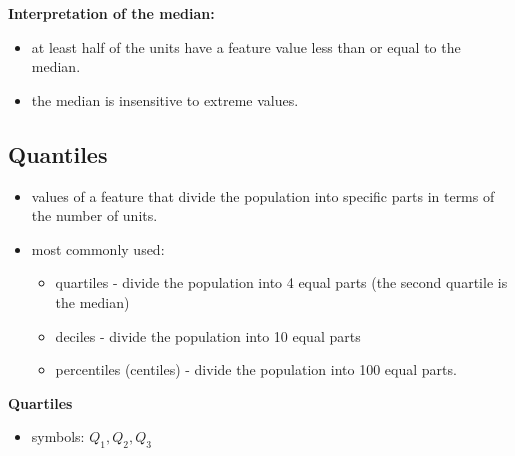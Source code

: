 \documentclass[
  english,
  letterpaper,
  DIV=11,
  numbers=noendperiod]{scrreprt}
\providecommand{\tightlist}{%
  \setlength{\itemsep}{0pt}\setlength{\parskip}{0pt}}
\begin{document}
\textbf{Interpretation of the median:}

\begin{itemize}
\tightlist
\item
  at least half of the units have a feature value less than or equal to
  the median.
\item
  the median is insensitive to extreme values.
\end{itemize}

\subsection{Quantiles}\label{quantiles}

\begin{itemize}
\tightlist
\item
  values of a feature that divide the population into specific parts in
  terms of the number of units.
\item
  most commonly used:

  \begin{itemize}
  \tightlist
  \item
    quartiles - divide the population into 4 equal parts (the second
    quartile is the median)
  \item
    deciles - divide the population into 10 equal parts
  \item
    percentiles (centiles) - divide the population into 100 equal parts.
  \end{itemize}
\end{itemize}

\textbf{Quartiles}

\begin{itemize}
\tightlist
\item
  symbols: \(Q_1, Q_2, Q_3\)
\end{itemize}
\end{document}

